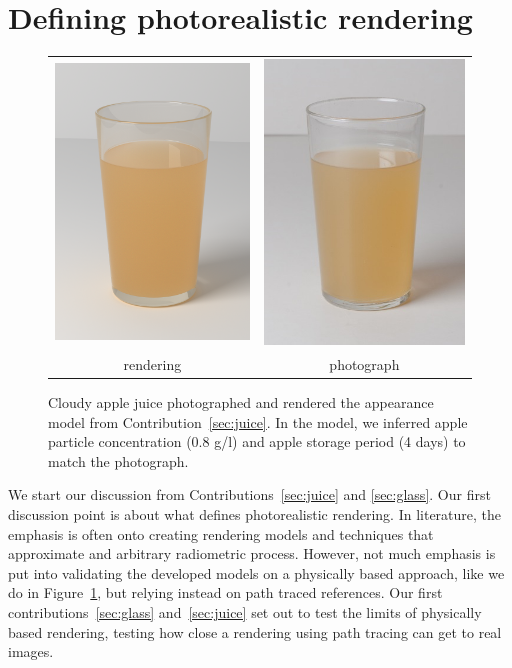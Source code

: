 \section{Defining photorealistic rendering}
\begin{figure}[t]
\centering
\begin{tabular}{@{}c@{}c@{}}
	 \includegraphics[width=0.4\columnwidth]{figures/teaser_render.png} &
	 \includegraphics[width=0.4\columnwidth]{figures/ref_img.jpg}  \\
	rendering & photograph \\
\end{tabular}
\caption{Cloudy apple juice photographed and rendered the appearance model from Contribution~\ref{sec:juice}. In the model, we inferred apple particle concentration (0.8 g/l) and apple storage period (4 days) to match the photograph.} %
\label{fig:juicecomparison}
\end{figure}

We start our discussion from Contributions~\ref{sec:juice} and \ref{sec:glass}. Our first discussion point is about what defines photorealistic rendering. In literature, the emphasis is often onto creating rendering models and techniques that approximate and arbitrary radiometric process. However, not much emphasis is put into validating the developed models on a physically based approach, like we do in Figure~\ref{fig:juicecomparison}, but relying instead on path traced references. Our first contributions~\ref{sec:glass} and~\ref{sec:juice} set out to test the limits of physically based rendering, testing how close a rendering using path tracing can get to real images. 

